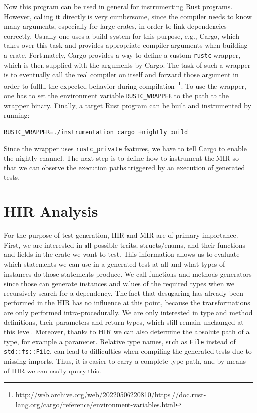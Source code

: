 \documentclass[paper=a4,%
  twoside,%
  BCOR4mm,%
  abstract=true,%
  toc=bibliography,%
  chapterprefix=true,%
  toc=bibliographynumbered,%
  open=right,%
  english,%
  pagesize=pdftex]{scrreprt}
\newcommand{\hir}{\ac{HIR}\xspace}
\newcommand{\mir}{\ac{MIR}\xspace}
\begin{document}
Now this program can be used in general for instrumenting Rust programs. However, calling it directly is very cumbersome, since the compiler needs to know many arguments, especially for large crates, in order to link dependencies correctly. Usually one uses a build system for this purpose, e.g., Cargo, which takes over this task and provides appropriate compiler arguments when building a crate. Fortunately, Cargo provides a way to define a custom \texttt{rustc} wrapper, which is then supplied with the arguments by Cargo. The task of such a wrapper is to eventually call the real compiler on itself and forward those argument in order to fullfil the expected behavior during compilation~\footnote{\url{http://web.archive.org/web/20220506220810/https://doc.rust-lang.org/cargo/reference/environment-variables.html}}. To use the wrapper, one has to set the environment variable \texttt{RUSTC\string_WRAPPER} to the path to the wrapper binary. Finally, a target Rust program can be built and instrumented by running:

\texttt{RUSTC\string_WRAPPER=./instrumentation cargo \string+nightly build}

Since the wrapper uses \texttt{rustc\string_private} features, we have to tell Cargo to enable the nightly channel. The next step is to define how to instrument the \mir so that we can observe the execution paths triggered by an execution of generated tests.


\section{HIR Analysis}
For the purpose of test generation, \hir and \mir are of primary importance. First, we are interested in all possible traits, structs/enums, and their functions and fields in the crate we want to test. This information allows us to evaluate which statements we can use in a generated test at all and what types of instances do those statements produce. We call functions and methods generators since those can generate instances and values of the required types when we recursively search for a dependency. The fact that desugaring has already been performed in the \hir has no influence at this point, because the transformations are only performed intra-procedurally. We are only interested in type and method definitions, their parameters and return types, which still remain unchanged at this level. Moreover, thanks to \hir we can also determine the absolute path of a type, for example a parameter. Relative type names, such as \texttt{File} instead of \texttt{std::fs::File}, can lead to difficulties when compiling the generated tests due to missing imports. Thus, it is easier to carry a complete type path, and by means of \hir we can easily query this.
\end{document}
